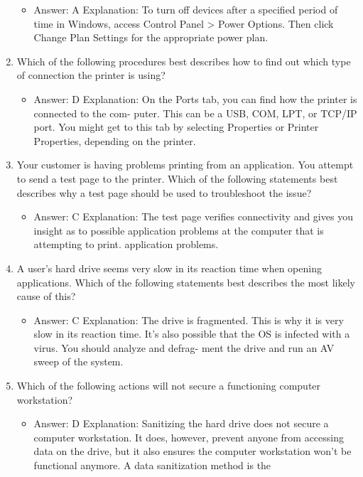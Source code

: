 \documentclass{article}
\begin{document}
\begin{enumerate}
\begin{itemize}
        \item Answer: A
Explanation: To turn off devices after a specified period of time in Windows, access
Control Panel > Power Options. Then click Change Plan Settings for the appropriate
power plan.
    \end{itemize}
    \item Which of the following procedures best describes how to find out
which type of connection the printer is using?
    \begin{itemize}
        \item Answer: D
Explanation: On the Ports tab, you can find how the printer is connected to the com-
puter. This can be a USB, COM, LPT, or TCP/IP port. You might get to this tab by
selecting Properties or Printer Properties, depending on the printer.
    \end{itemize}
    \item Your customer is having problems printing from an application.
You attempt to send a test page to the printer. Which of the following
statements best describes why a test page should be used to
troubleshoot the issue?
    \begin{itemize}
        \item Answer: C
Explanation: The test page verifies connectivity and gives you insight as to possible
application problems at the computer that is attempting to print.
application problems.
    \end{itemize}
    \item A user’s hard drive seems very slow in its reaction time when
opening applications. Which of the following statements best
describes the most likely cause of this?
    \begin{itemize}
        \item Answer: C
Explanation: The drive is fragmented. This is why it is very slow in its reaction time.
It’s also possible that the OS is infected with a virus. You should analyze and defrag-
ment the drive and run an AV sweep of the system.
    \end{itemize}
    \item Which of the following actions will not secure a functioning computer
workstation?
    \begin{itemize}
        \item Answer: D
Explanation: Sanitizing the hard drive does not secure a computer workstation. It does,
however, prevent anyone from accessing data on the drive, but it also ensures the
computer workstation won’t be functional anymore. A data sanitization method is the

\end{itemize}
\end{enumerate}
\end{document}

